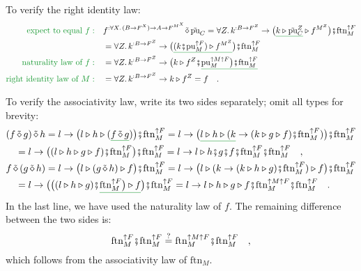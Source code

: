 To verify the right identity law:
\begin{align*}
{\color{greenunder}\text{expect to equal }f:}\quad & f^{:\forall X.\,(B\rightarrow F^{X})\rightarrow A\rightarrow F^{M^{X}}}\tilde{\diamond}\,\tilde{\text{pu}}_{C}=\forall Z.\,k^{:B\rightarrow F^{Z}}\rightarrow\big(\gunderline{k\triangleright\tilde{\text{pu}}_{C}^{Z}}\triangleright f^{M^{Z}}\big)\bef\text{ftn}_{M}^{\uparrow F}\\
 & =\forall Z.\,k^{:B\rightarrow F^{Z}}\rightarrow\big(\gunderline{(k\bef\text{pu}_{M}^{\uparrow F})\triangleright f^{M^{Z}}}\big)\bef\text{ftn}_{M}^{\uparrow F}\\
{\color{greenunder}\text{naturality law of }f:}\quad & =\forall Z.\,k^{:B\rightarrow F^{Z}}\rightarrow\big(k\triangleright f^{Z}\bef\gunderline{\text{pu}_{M}^{\uparrow M\uparrow F}\big)\bef\text{ftn}_{M}^{\uparrow F}}\\
{\color{greenunder}\text{right identity law of }M:}\quad & =\forall Z.\,k^{:B\rightarrow F^{Z}}\rightarrow k\triangleright f^{Z}=f\quad.
\end{align*}

To verify the associativity law, write its two sides separately; omit
all types for brevity:
\begin{align*}
 & (f\,\tilde{\diamond}\,g)\,\tilde{\diamond}\,h=l\rightarrow\big(l\triangleright h\triangleright(\gunderline{f\,\tilde{\diamond}\,g})\big)\bef\text{ftn}_{M}^{\uparrow F}=l\rightarrow\big(\gunderline{l\triangleright h\triangleright(k}\rightarrow(k\triangleright g\triangleright f)\bef\text{ftn}_{M}^{\uparrow F})\big)\bef\text{ftn}_{M}^{\uparrow F}\\
 & \quad=l\rightarrow\big((l\triangleright h\triangleright g\triangleright f)\bef\text{ftn}_{M}^{\uparrow F}\big)\bef\text{ftn}_{M}^{\uparrow F}=l\rightarrow l\triangleright h\bef g\bef f\bef\text{ftn}_{M}^{\uparrow F}\bef\text{ftn}_{M}^{\uparrow F}\quad,\\
 & f\,\tilde{\diamond}\,(g\,\tilde{\diamond}\,h)=l\rightarrow\big(l\triangleright(g\,\tilde{\diamond}\,h)\triangleright f\big)\bef\text{ftn}_{M}^{\uparrow F}=l\rightarrow\big(l\triangleright(k\rightarrow(k\triangleright h\triangleright g)\bef\text{ftn}_{M}^{\uparrow F})\triangleright f\big)\bef\text{ftn}_{M}^{\uparrow F}\\
 & \quad=l\rightarrow\big(\big((l\triangleright h\triangleright g)\bef\gunderline{\text{ftn}_{M}^{\uparrow F}\big)\triangleright f}\big)\bef\text{ftn}_{M}^{\uparrow F}=l\rightarrow l\triangleright h\triangleright g\triangleright f\bef\text{ftn}_{M}^{\uparrow M\uparrow F}\bef\text{ftn}_{M}^{\uparrow F}\quad.
\end{align*}
In the last line, we have used the naturality law of $f$. The remaining
difference between the two sides is:
\[
\text{ftn}_{M}^{\uparrow F}\bef\text{ftn}_{M}^{\uparrow F}\overset{?}{=}\text{ftn}_{M}^{\uparrow M\uparrow F}\bef\text{ftn}_{M}^{\uparrow F}\quad,
\]
which follows from the associativity law of $\text{ftn}_{M}$.

